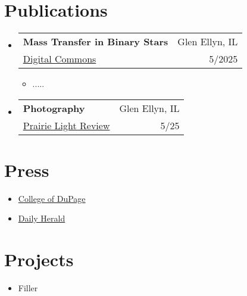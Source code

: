 \documentclass[letterpaper,11pt]{article}
\makeatletter
\newcommand{\cvitem}[1]{
  \item\small{
    {#1\vspace{-2pt}}
  }
}
\newcommand{\cvheading}[4]{
  \vspace{-2pt}\item
    \begin{tabular*}{\textwidth}[t]{l@{\extracolsep{\fill}}r}
      \textbf{#1} & #2 \\
      \small#3 & \small #4 \\
    \end{tabular*}\vspace{-7pt}
}
\newcommand{\cvheadingstart}{\begin{itemize}[leftmargin=0in, label={}]}
\newcommand{\cvheadingend}{\end{itemize}}
\newcommand{\cvitemstart}{\begin{itemize}[label=\textopenbullet]\justifying}
\newcommand{\cvitemend}{\end{itemize}\vspace{-5pt}}
\makeatother
\begin{document}
\section{Publications}
  \cvheadingstart
  \cvheading
    {Mass Transfer in Binary Stars}
    {Glen Ellyn, IL}
    {\href{https://dc.cod.edu/srs/2025/schedule/25/}{Digital Commons}}
    {5/2025}
  \cvitemstart
  \cvitem{.....}
  \cvitemend
  \cvheading{Photography}{Glen Ellyn, IL}{\href{https://prairielightreview.squarespace.com/}{Prairie Light Review}}{5/25}
  \cvheadingend

\section{Press}

  \cvitemstart
  \cvitem{\href{https://www.cod.edu/about/stories/students/lipschultz.html}{College of DuPage}}
  \cvitem{\href{https://www.dailyherald.com/20250326/submitted-content/stories-of-space-and-college-of-dupage-students-advance-space-exploration-with-weather-balloon-launc/}{Daily Herald}}
  \cvitemend

\section{Projects}
\cvitemstart
  \cvitem{Filler}
\cvitemend
\end{document}
